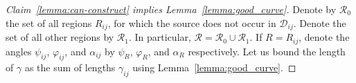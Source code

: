 \begin{proof}[Claim~\ref{lemma:can-construct} implies Lemma~\ref{lemma:good_curve}]


%
Denote by $\mathcal{R}_0$ the set of all regions $R_{ij}$, for which the source does not occur in $\mathcal{D}_{ij}$. Denote the set of all other regions by $\mathcal{R}_1$. In particular, $\mathcal{R} = \mathcal{R}_0\cup\mathcal{R}_1$. If $R = R_{ij}$, denote the angles $\psi_{ij}$, $\varphi_{ij}$, and $\alpha_{ij}$ by $\psi_R$, $\varphi_R$, and $\alpha_R$ respectively. Let us bound the length of $\gamma$ as the sum of lengths $\gamma_{ij}$ using Lemma~\ref{lemma:good_curve}.



\end{proof}
